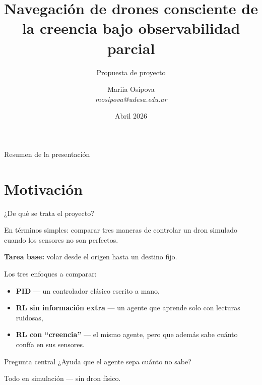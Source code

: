 \documentclass[11pt]{beamer}
\title{Navegación de drones consciente de la creencia bajo observabilidad parcial}
\subtitle{Propuesta de proyecto}
\author[M. Osipova]{Mariia Osipova\\[3pt]\textit{mosipova@udesa.edu.ar}}
\institute{\\[12pt]Bajo la supervisión de Juan Felipe Perdomo}
\date[Abr 2026]{Abril 2026}
\begin{document}

\begin{frame}
    \titlepage
\end{frame}


\begin{frame}{Resumen de la presentación}
  \tableofcontents
\end{frame}


\section{Motivación}


\begin{frame}{¿De qué se trata el proyecto?}

En términos simples: comparar tres maneras de controlar un dron simulado cuando los sensores no son perfectos.

\medskip
\textbf{Tarea base:} volar desde el origen hasta un destino fijo.

\medskip
Los tres enfoques a comparar:
\begin{itemize}
  \item \textbf{PID} --- un controlador clásico escrito a mano,
  \item \textbf{RL sin información extra} --- un agente que aprende solo con lecturas ruidosas,
  \item \textbf{RL con ``creencia''} --- el mismo agente, pero que además sabe cuánto confía en sus sensores.
\end{itemize}

\medskip
\begin{block}{Pregunta central}
¿Ayuda que el agente sepa cuánto no sabe?
\end{block}

\smallskip
{\small Todo en simulación --- sin dron físico.}
\end{frame}

\end{document}

